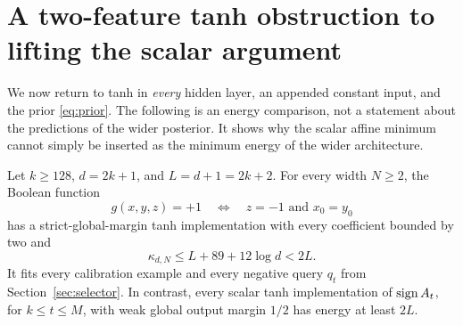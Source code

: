 \section{A two-feature tanh obstruction to lifting the scalar argument}
\label{sec:tanh}

We now return to tanh in \emph{every} hidden layer, an appended constant
input, and the prior \eqref{eq:prior}. The following is an energy
comparison, not a statement about the predictions of the wider posterior.
It shows why the scalar affine minimum cannot simply be inserted as
the minimum energy of the wider architecture.

\begin{proposition}
\label{prop:tanh-shortcut}
Let $k\ge128$, $d=2k+1$, and $L=d+1=2k+2$.
For every width $N\ge2$, the Boolean function
\[
 g(x,y,z)=+1\quad\Longleftrightarrow\quad z=-1\text{ and }x_0=y_0
\]
has a strict-global-margin tanh implementation with every coefficient
bounded by two and
\[
 \kappa_{d,N}\le L+89+12\log d<2L.
\]
It fits every calibration example and every negative query $q_t$ from
Section~\ref{sec:selector}.
In contrast, every scalar tanh implementation of $\operatorname{sign} A_t$, for
$k\le t\le M$, with weak global output margin $1/2$ has energy at least
$2L$.
\end{proposition}
